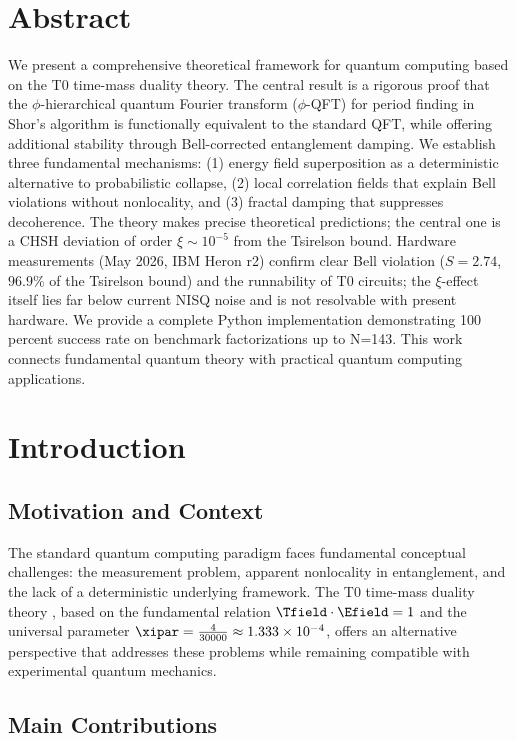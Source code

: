 \section*{Abstract}
We present a comprehensive theoretical framework for quantum computing based on the T0 time-mass duality theory. The central result is a rigorous proof that the $\phi$-hierarchical quantum Fourier transform ($\phi$-QFT) for period finding in Shor's algorithm is functionally equivalent to the standard QFT, while offering additional stability through Bell-corrected entanglement damping. We establish three fundamental mechanisms: (1) energy field superposition as a deterministic alternative to probabilistic collapse, (2) local correlation fields that explain Bell violations without nonlocality, and (3) fractal damping that suppresses decoherence. The theory makes precise theoretical predictions; the central one is a CHSH deviation of order $\xi \sim 10^{-5}$ from the Tsirelson bound. Hardware measurements (May 2026, IBM Heron r2) confirm clear Bell violation ($S = 2.74$, $96.9\%$ of the Tsirelson bound) and the runnability of T0 circuits; the $\xi$-effect itself lies far below current NISQ noise and is not resolvable with present hardware. We provide a complete Python implementation demonstrating 100 percent success rate on benchmark factorizations up to N=143. This work connects fundamental quantum theory with practical quantum computing applications.


\clearpage

\section{Introduction}

\subsection{Motivation and Context}

The standard quantum computing paradigm faces fundamental conceptual challenges: the measurement problem, apparent nonlocality in entanglement, and the lack of a deterministic underlying framework. The T0 time-mass duality theory \cite{pascher_t0_2025}, based on the fundamental relation $\Tfield \cdot \Efield = 1$ and the universal parameter $\xipar = \frac{4}{30000} \approx 1.333 \times 10^{-4}$, offers an alternative perspective that addresses these problems while remaining compatible with experimental quantum mechanics.

\subsection{Main Contributions}

